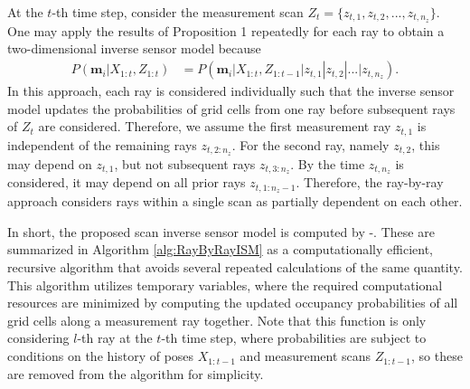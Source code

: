 At the $t$-th time step, consider the measurement scan $Z_t=\{z_{t,1},z_{t,2},...,z_{t,n_z}\}$. One may apply the results of Proposition 1 repeatedly for each ray to obtain a two-dimensional inverse sensor model because
\begin{align}
\label{eqn:RayByRayScanISM}
P(\mathbf{m}_i|X_{1:t},Z_{1:t})&%
=P(\mathbf{m}_i|X_{1:t},Z_{1:t-1}|z_{t,1}|z_{t,2}|...|z_{t,n_z}).
\end{align}
In this approach, each ray is considered individually such that the inverse sensor model updates the probabilities of grid cells from one ray before subsequent rays of $Z_t$ are considered. Therefore, we assume the first measurement ray $z_{t,1}$ is independent of the remaining rays $z_{t,2:n_z}$. For the second ray, namely $z_{t,2}$, this may depend on $z_{t,1}$, but not subsequent rays $z_{t,3:n_z}$. By the time $z_{t,n_z}$ is considered, it may depend on all prior rays $z_{t,1:n_z-1}$. Therefore, the ray-by-ray approach considers rays within a single scan as partially dependent on each other.

In short, the proposed scan inverse sensor model is computed by -. These are summarized in Algorithm \ref{alg:RayByRayISM} as a computationally efficient, recursive algorithm that avoids several repeated calculations of the same quantity. This algorithm utilizes temporary variables, where the required computational resources are minimized by computing the updated occupancy probabilities of all grid cells along a measurement ray together. Note that this function is only considering $l$-th ray at the $t$-th time step, where probabilities are subject to conditions on the history of poses $X_{1:t-1}$ and measurement scans $Z_{1:t-1}$, so these are removed from the algorithm for simplicity.

